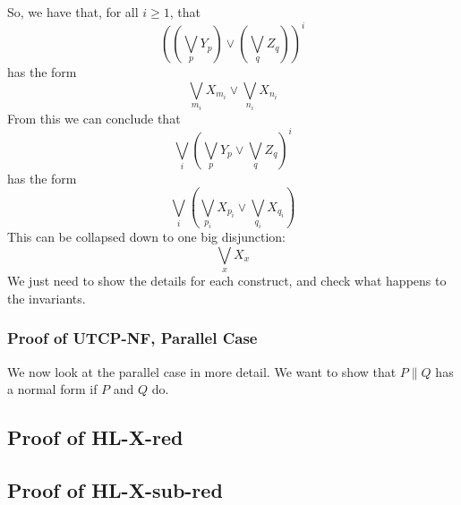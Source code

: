 So, we
have that, for all $i \geq 1$, that
\[
  ((\bigvee_p Y_p) \lor (\bigvee_q Z_q))^i
\]
has the form
\[
 \bigvee_{m_i} X_{m_i} \lor \bigvee_{n_i} X_{n_i}
\]
From this we can conclude
that
\[
 \bigvee_i (\bigvee_p Y_p \lor \bigvee_q Z_q)^i
\]
has the form
\[
  \bigvee_i (\bigvee_{p_i} X_{p_i} \lor \bigvee_{q_i} X_{q_i})
\]
This can be collapsed down to one big disjunction:
\[
  \bigvee_x X_x
\]
We just need to show the details for each construct,
and check what happens to the invariants.

\subsubsection{Proof of \textsf{UTCP-NF}, Parallel Case}

We now look at the parallel case in more detail.
We want to show that $P \parallel Q$ has a normal form
if $P$ and $Q$ do.


\newpage
\subsection{Proof of \textsf{HL-X-red}}

\newpage
\subsection{Proof of \textsf{HL-X-sub-red}}

